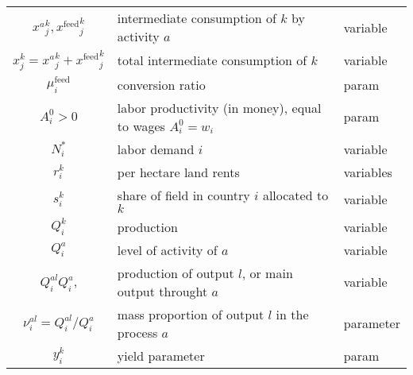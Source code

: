 \begin{tabular}{c|l|l}
    ${x^a}_j^k, {x^\text{feed}}_j^k$            & intermediate consumption of $k$ by activity $a$                    & variable                 \\

    ${x}_j^k = {x^a}_j^k + {x^\text{feed}}_j^k$ & total intermediate consumption of $k$                              & variable                 \\

    ${\mu_i^\text{feed}}$                       & conversion ratio                                                   & param                    \\

    $A_i^0 > 0$                                 & labor productivity (in money), equal to wages $A_i^0 = w_i$        & param                    \\

    $N_i^*$                                     & labor demand $i$                                                   & variable                 \\

    $r_i^k$                                     & per hectare land rents                                             & variables                \\

    $s_i^k$                                     & share of field in country $i$ allocated to $k$                     & variable                 \\

    $Q_i^k$                                     & production                                                         & variable                 \\

    $Q_i^a$                                     & level of activity of $a$                                           & variable                 \\

    $Q_i^{al} Q_i^{a}$,                         & production of output $l$, or main output throught $a$              & variable                 \\

    $\nu_i^{al} = Q_i^{al} / Q_i^a$             & mass proportion of output $l$ in the process $a$                   & parameter                \\

    $y_i^k$                                     & yield parameter                                                    & param                    \\


\end{tabular}
